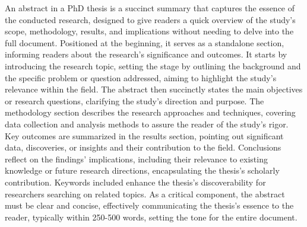 
An abstract in a PhD thesis is a succinct summary that captures the essence of the conducted research, designed to give readers a quick overview of the study's scope, methodology, results, and implications without needing to delve into the full document.
Positioned at the beginning, it serves as a standalone section, informing readers about the research's significance and outcomes.
It starts by introducing the research topic, setting the stage by outlining the background and the specific problem or question addressed, aiming to highlight the study's relevance within the field.
The abstract then succinctly states the main objectives or research questions, clarifying the study's direction and purpose.
The methodology section describes the research approaches and techniques, covering data collection and analysis methods to assure the reader of the study's rigor.
Key outcomes are summarized in the results section, pointing out significant data, discoveries, or insights and their contribution to the field.
Conclusions reflect on the findings' implications, including their relevance to existing knowledge or future research directions, encapsulating the thesis's scholarly contribution.
Keywords included enhance the thesis's discoverability for researchers searching on related topics.
As a critical component, the abstract must be clear and concise, effectively communicating the thesis's essence to the reader, typically within 250-500 words, setting the tone for the entire document.